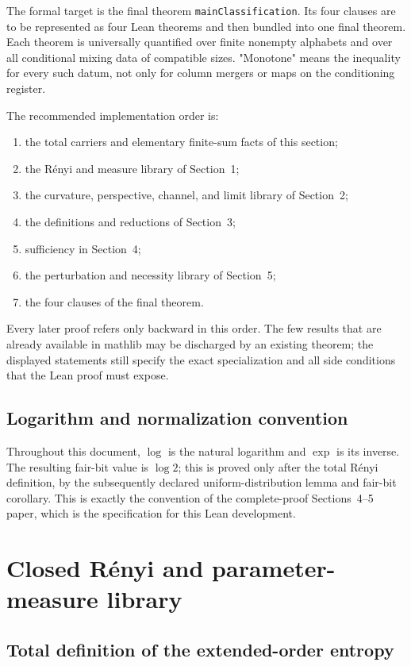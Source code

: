 \documentclass[9pt]{extarticle}
\theoremstyle{definition}
\theoremstyle{remark}
\begin{document}
The formal target is the final theorem \texttt{mainClassification}. Its four clauses are
to be represented as four Lean theorems and then bundled into one final
theorem.  Each theorem is universally quantified over finite nonempty
alphabets and over all conditional mixing data of compatible sizes.
"Monotone" means the inequality for every such datum, not only for column
mergers or maps on the conditioning register.

The recommended implementation order is:
\begin{enumerate}
 \item the total carriers and elementary finite-sum facts of this section;
 \item the R\'enyi and measure library of Section~1;
 \item the curvature, perspective, channel, and limit library of Section~2;
 \item the definitions and reductions of Section~3;
 \item sufficiency in Section~4;
 \item the perturbation and necessity library of Section~5;
 \item the four clauses of the final theorem.
\end{enumerate}
Every later proof refers only backward in this order.  The few results that
are already available in mathlib may be discharged by an existing theorem;
the displayed statements still specify the exact specialization and all side
conditions that the Lean proof must expose.

\subsection{Logarithm and normalization convention}

Throughout this document, $\log$ is the natural logarithm and $\exp$ is its
inverse. The resulting fair-bit value is $\log2$; this is proved only after
the total R\'enyi definition, by the subsequently declared uniform-distribution
lemma and fair-bit corollary. This is exactly the convention of the
complete-proof Sections~4--5 paper, which is the specification for this Lean
development.

\section{Closed R\'enyi and parameter-measure library}
\label{sec:renyi-foundations}

\subsection{Total definition of the extended-order entropy}
\end{document}
